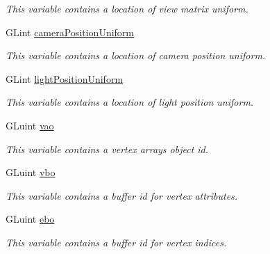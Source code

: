 \begin{DoxyCompactItemize}
\begin{DoxyCompactList}\small\item\em This variable contains a location of view matrix uniform. \end{DoxyCompactList}\item 
\hypertarget{structPhongVariables_a8ef62f404f03093b3e1da8f9d059646c}{}G\+Lint \hyperlink{structPhongVariables_a8ef62f404f03093b3e1da8f9d059646c}{camera\+Position\+Uniform}\label{structPhongVariables_a8ef62f404f03093b3e1da8f9d059646c}

\begin{DoxyCompactList}\small\item\em This variable contains a location of camera position uniform. \end{DoxyCompactList}\item 
\hypertarget{structPhongVariables_ac9e7ae0dd5a25a5b7b1cb8550f003c73}{}G\+Lint \hyperlink{structPhongVariables_ac9e7ae0dd5a25a5b7b1cb8550f003c73}{light\+Position\+Uniform}\label{structPhongVariables_ac9e7ae0dd5a25a5b7b1cb8550f003c73}

\begin{DoxyCompactList}\small\item\em This variable contains a location of light position uniform. \end{DoxyCompactList}\item 
\hypertarget{structPhongVariables_af01c9a1a6d56f621354a6d728cfe5731}{}G\+Luint \hyperlink{structPhongVariables_af01c9a1a6d56f621354a6d728cfe5731}{vao}\label{structPhongVariables_af01c9a1a6d56f621354a6d728cfe5731}

\begin{DoxyCompactList}\small\item\em This variable contains a vertex arrays object id. \end{DoxyCompactList}\item 
\hypertarget{structPhongVariables_a33b1bfb11c7032aafbb6fcc7d2589798}{}G\+Luint \hyperlink{structPhongVariables_a33b1bfb11c7032aafbb6fcc7d2589798}{vbo}\label{structPhongVariables_a33b1bfb11c7032aafbb6fcc7d2589798}

\begin{DoxyCompactList}\small\item\em This variable contains a buffer id for vertex attributes. \end{DoxyCompactList}\item 
\hypertarget{structPhongVariables_a9202c74c287b49b3b00ace28a8475fb4}{}G\+Luint \hyperlink{structPhongVariables_a9202c74c287b49b3b00ace28a8475fb4}{ebo}\label{structPhongVariables_a9202c74c287b49b3b00ace28a8475fb4}

\begin{DoxyCompactList}\small\item\em This variable contains a buffer id for vertex indices. \end{DoxyCompactList}\end{DoxyCompactItemize}


